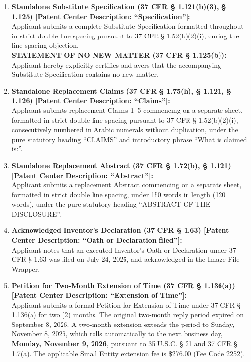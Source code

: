 \documentclass[11pt,letterpaper]{article}
\begin{document}
\begin{enumerate}[leftmargin=*]
    \item \textbf{Standalone Substitute Specification (37 CFR \S{} 1.121(b)(3), \S{} 1.125) [Patent Center Description: ``Specification'']:} \\
    Applicant submits a complete Substitute Specification formatted throughout in strict double line spacing pursuant to 37 CFR \S{} 1.52(b)(2)(i), curing the line spacing objection. \\
    \textbf{STATEMENT OF NO NEW MATTER (37 CFR \S{} 1.125(b)):} Applicant hereby explicitly certifies and avers that the accompanying Substitute Specification contains no new matter.

    \item \textbf{Standalone Replacement Claims (37 CFR \S{} 1.75(h), \S{} 1.121, \S{} 1.126) [Patent Center Description: ``Claims'']:} \\
    Applicant submits replacement Claims 1--5 commencing on a separate sheet, formatted in strict double line spacing pursuant to 37 CFR \S{} 1.52(b)(2)(i), consecutively numbered in Arabic numerals without duplication, under the pure statutory heading ``CLAIMS'' and introductory phrase ``What is claimed is:''.

    \item \textbf{Standalone Replacement Abstract (37 CFR \S{} 1.72(b), \S{} 1.121) [Patent Center Description: ``Abstract'']:} \\
    Applicant submits a replacement Abstract commencing on a separate sheet, formatted in strict double line spacing, under 150 words in length (120 words), under the pure statutory heading ``ABSTRACT OF THE DISCLOSURE''.

    \item \textbf{Acknowledged Inventor's Declaration (37 CFR \S{} 1.63) [Patent Center Description: ``Oath or Declaration filed'']:} \\
    Applicant notes that an executed Inventor's Oath or Declaration under 37 CFR \S{} 1.63 was filed on July 24, 2026, and acknowledged in the Image File Wrapper.

    \item \textbf{Petition for Two-Month Extension of Time (37 CFR \S{} 1.136(a)) [Patent Center Description: ``Extension of Time'']:} \\
    Applicant submits a formal Petition for Extension of Time under 37 CFR \S{} 1.136(a) for two (2) months. The original two-month reply period expired on September 8, 2026. A two-month extension extends the period to Sunday, November 8, 2026, which rolls automatically to the next business day, \textbf{Monday, November 9, 2026}, pursuant to 35 U.S.C. \S{} 21 and 37 CFR \S{} 1.7(a). The applicable Small Entity extension fee is \$276.00 (Fee Code 2252).


\end{enumerate}
\end{document}
